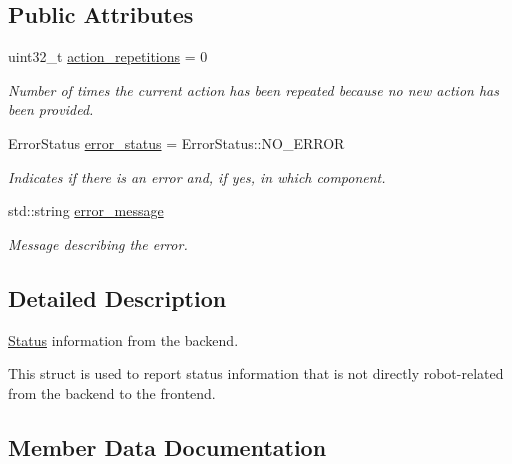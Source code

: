 \subsection*{Public Attributes}
\begin{DoxyCompactItemize}
\item 
uint32\+\_\+t \hyperlink{structrobot__interfaces_1_1Status_a8ccb682cd2ba81059991f3b0b9ff0c00}{action\+\_\+repetitions} = 0\hypertarget{structrobot__interfaces_1_1Status_a8ccb682cd2ba81059991f3b0b9ff0c00}{}\label{structrobot__interfaces_1_1Status_a8ccb682cd2ba81059991f3b0b9ff0c00}

\begin{DoxyCompactList}\small\item\em Number of times the current action has been repeated because no new action has been provided. \end{DoxyCompactList}\item 
Error\+Status \hyperlink{structrobot__interfaces_1_1Status_a80ffe66121d425d48386b39984cd4c7b}{error\+\_\+status} = Error\+Status\+::\+N\+O\+\_\+\+E\+R\+R\+OR\hypertarget{structrobot__interfaces_1_1Status_a80ffe66121d425d48386b39984cd4c7b}{}\label{structrobot__interfaces_1_1Status_a80ffe66121d425d48386b39984cd4c7b}

\begin{DoxyCompactList}\small\item\em Indicates if there is an error and, if yes, in which component. \end{DoxyCompactList}\item 
std\+::string \hyperlink{structrobot__interfaces_1_1Status_a7da10fb73cd19f2840c438d321eac744}{error\+\_\+message}
\begin{DoxyCompactList}\small\item\em Message describing the error. \end{DoxyCompactList}\end{DoxyCompactItemize}


\subsection{Detailed Description}
\hyperlink{structrobot__interfaces_1_1Status}{Status} information from the backend. 

This struct is used to report status information that is not directly robot-\/related from the backend to the frontend. 

\subsection{Member Data Documentation}
